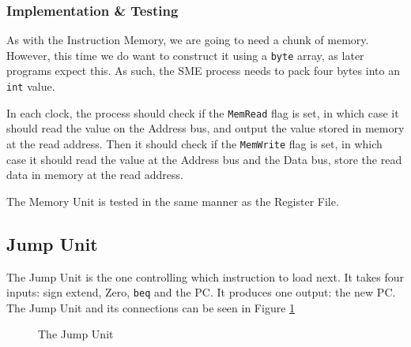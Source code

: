 \subsubsection*{Implementation \& Testing}
As with the Instruction Memory, we are going to need a chunk of memory.
However, this time we do want to construct it using a \texttt{byte} array, as
later programs expect this. As such, the SME process needs to pack four bytes
into an \texttt{int} value.

In each clock, the process should check if the \texttt{MemRead} flag is set, in
which case it should read the value on the Address bus, and output the value
stored in memory at the read address. Then it should check if the
\texttt{MemWrite} flag is set, in which case it should read the value at the
Address bus and the Data bus, store the read data in memory at the read
address.

The Memory Unit is tested in the same manner as the Register File.

\subsection{Jump Unit}
The Jump Unit is the one controlling which instruction to load next. It takes
four inputs: sign extend, Zero, \texttt{beq} and the PC. It
produces one output: the new PC. The Jump Unit and its connections
can be seen in Figure \ref{fig:jump}
\begin{figure}
    \centering
    \caption{The Jump Unit}
    \label{fig:jump}
\end{figure}

